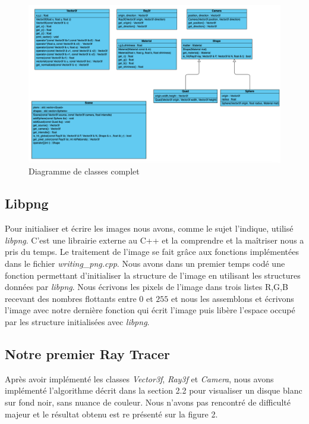 \documentclass[11pt, oneside]{article}   	%
\begin{document}
\begin{figure}
    \centering
    \includegraphics[scale=0.45]{rapport/UML.png}
    \caption{Diagramme de classes complet}
    \label{fig:my_label}
\end{figure}

\subsection{Libpng}
Pour initialiser et écrire les images nous avons, comme le sujet l'indique, utilisé \textit{libpng}. C'est une librairie externe au C++ et la comprendre et la maîtriser nous a pris du temps. Le traitement de l'image se fait grâce aux fonctions implémentées dans le fichier \textit{writing\_png.cpp}. Nous avons dans un premier temps codé une fonction permettant d'initialiser la structure de l'image en utilisant les structures données par \textit{libpng}. Nous écrivons les pixels de l'image dans trois listes R,G,B recevant des nombres flottants entre $0$ et $255$ et nous les assemblons et écrivons l'image avec notre dernière fonction qui écrit l'image puis libère l'espace occupé par les structure initialisées avec \textit{libpng}.

\subsection{Notre premier Ray Tracer}
Après avoir implémenté les classes \textit{Vector3f}, \textit{Ray3f} et \textit{Camera}, nous avons implémenté l'algorithme décrit dans la section 2.2 pour visualiser un disque blanc sur fond noir, sans nuance de couleur.
Nous n'avons pas rencontré de difficulté majeur et le résultat obtenu est re
présenté sur la figure 2.
\end{document}
